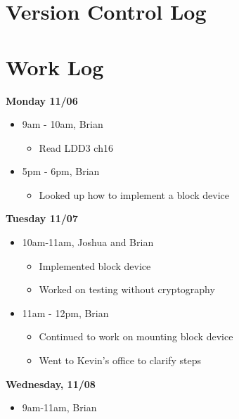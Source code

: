 \documentclass[letterpaper, onecolumn, draftclsnofoot, 10pt, compsoc]{IEEEtran}
\begin{document}
\section{Version Control Log}
    
    
\section{Work Log}
    \begin{singlespace}
        \textbf{Monday 11/06}
            \begin{itemize}
                \item 9am - 10am, Brian 
                \begin{itemize}
                    \item Read LDD3 ch16
                \end{itemize}
                \item 5pm - 6pm, Brian 
                    \begin{itemize}
                        \item Looked up how to implement a block device 
                    \end{itemize}
            \end{itemize}
        \textbf{Tuesday 11/07}
            \begin{itemize}
                \item 10am-11am, Joshua and Brian 
                \begin{itemize}
                    \item Implemented block device 
                    \item Worked on testing without cryptography
                \end{itemize}
                \item 11am - 12pm, Brian 
                    \begin{itemize}
                        \item Continued to work on mounting block device
                        \item Went to Kevin's office to clarify steps
                    \end{itemize}
            \end{itemize}
        \textbf{Wednesday, 11/08}
            \begin{itemize}
                \item 9am-11am, Brian
                \begin{itemize}

\end{itemize}
\end{itemize}
\end{singlespace}
\end{document}
